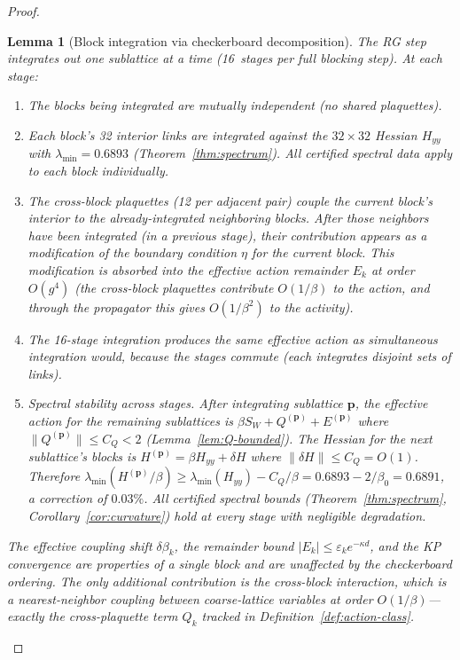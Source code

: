 \documentclass[11pt]{article}
\newtheorem{lemma}[theorem]{Lemma}
\theoremstyle{definition}
\begin{document}
\begin{proof}
\begin{lemma}[Block integration via checkerboard decomposition]
The RG step integrates out one sublattice at a time
(16~stages per full blocking step).  At each stage:
\begin{enumerate}[nosep]
\item The blocks being integrated are mutually independent
(no shared plaquettes).
\item Each block's 32 interior links are integrated against
the $32\times 32$ Hessian $H_{yy}$ with
$\lambda_{\min}=0.6893$ (Theorem~\ref{thm:spectrum}).
All certified spectral data apply to each block individually.
\item The cross-block plaquettes (12 per adjacent pair) couple
the current block's interior to the \emph{already-integrated}
neighboring blocks.  After those neighbors have been integrated
(in a previous stage), their contribution appears as a
modification of the boundary condition $\eta$ for the
current block.  This modification is absorbed into the
effective action remainder $E_k$ at order $O(g^4)$
(the cross-block plaquettes contribute $O(1/\beta)$ to
the action, and through the propagator this gives
$O(1/\beta^2)$ to the activity).
\item The 16-stage integration produces the same effective
action as simultaneous integration would, because the stages
commute (each integrates disjoint sets of links).
\item \emph{Spectral stability across stages.}
After integrating sublattice $\mathbf{p}$, the effective
action for the remaining sublattices is
$\beta S_W+Q^{(\mathbf{p})}+E^{(\mathbf{p})}$
where $\|Q^{(\mathbf{p})}\|\le C_Q<2$
(Lemma~\ref{lem:Q-bounded}).
The Hessian for the \emph{next} sublattice's blocks is
$H^{(\mathbf{p})}=\beta H_{yy}+\delta H$ where
$\|\delta H\|\le C_Q=O(1)$.
Therefore $\lambda_{\min}(H^{(\mathbf{p})}/\beta)
\ge\lambda_{\min}(H_{yy})-C_Q/\beta
=0.6893-2/\beta_0=0.6891$, a correction of $0.03\%$.
All certified spectral bounds
(Theorem~\ref{thm:spectrum}, Corollary~\ref{cor:curvature})
hold at every stage with negligible degradation.
\end{enumerate}

The effective coupling shift $\delta\beta_k$, the remainder
bound $|E_k|\le\varepsilon_k e^{-\kappa d}$, and the KP
convergence are properties of a \emph{single block} and
are unaffected by the checkerboard ordering.
The only additional contribution is the cross-block interaction,
which is a nearest-neighbor coupling between coarse-lattice
variables at order $O(1/\beta)$---exactly the cross-plaquette
term $Q_k$ tracked in Definition~\ref{def:action-class}.
\end{lemma}


\end{proof}
\end{document}
